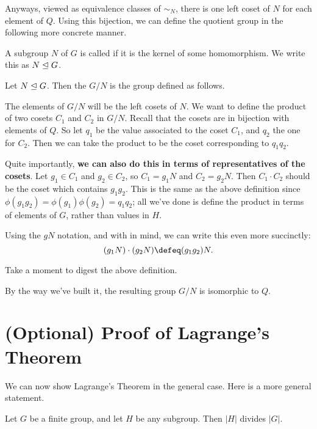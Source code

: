 Anyways, viewed as equivalence classes of $\sim_N$, there is one left coset of $N$ for each element of $Q$.
Using this bijection, we can define the quotient group in the following more concrete manner.

\begin{definition}
	A subgroup $N$ of $G$ is called  if it is the
	kernel of some homomorphism.
	We write this as $N \trianglelefteq G$.
\end{definition}
\begin{definition}
	Let $N \trianglelefteq G$.
	Then the  $G/N$ is the group defined as follows.
	\begin{itemize}
		\ii The elements of $G/N$ will be the left cosets of $N$.
		\ii We want to define the product of two cosets $C_1$ and $C_2$ in $G/N$.
		Recall that the cosets are in bijection with elements of $Q$.
		So let $q_1$ be the value associated to the coset $C_1$,
		and $q_2$ the one for $C_2$.
		Then we can take the product to be the coset corresponding to $q_1q_2$.

		Quite importantly,
		\textbf{we can also do this in terms of representatives of the cosets}.
		Let $g_1 \in C_1$ and $g_2 \in C_2$,
		so $C_1 = g_1N$ and $C_2 = g_2N$.
		Then $C_1 \cdot C_2$ should be the coset which contains $g_1g_2$.
		This is the same as the above definition since
		$\phi(g_1g_2) = \phi(g_1)\phi(g_2) = q_1q_2$;
		all we've done is define the product in terms of elements of $G$,
		rather than values in $H$.

		Using the $gN$ notation,
		and with  in mind,
		we can write this even more succinctly:
		\[ (g_1N) \cdot (g_2N) \defeq (g_1g_2)N. \]
	\end{itemize}
\end{definition}
\begin{ques}
	Take a moment to digest the above definition.
\end{ques}
By the way we've built it, the resulting group $G/N$ is isomorphic to $Q$.

\section{(Optional) Proof of Lagrange's Theorem}
We can now show Lagrange's Theorem in the general case.
Here is a more general statement.
\begin{theorem}
	\label{thm:lagrange_grp}
	Let $G$ be a finite group, and let $H$ be any subgroup.
	Then $\left\lvert H \right\rvert$ divides $\left\lvert G \right\rvert$.
\end{theorem}

